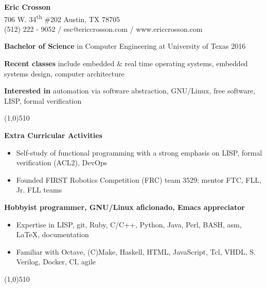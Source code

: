\documentclass{report}
\newcommand{\cut}{\begin{center} \line(1,0){510} \end{center}}
\begin{document}
\pagestyle{empty}
\setlength\parindent{0pt}

\begin{center}
  \textbf{Eric Crosson} \\
  706 W. 34\textsuperscript{th} \#202 Austin, TX 78705 \\
  (512) 222 - 9052 / esc@ericcrosson.com / www.ericcrosson.com
\end{center}

\textbf{Bachelor of Science} in Computer Engineering at University of Texas
2016

\vspace{1mm}

\textbf{Recent classes} include embedded \& real time operating systems,
embedded systems design, computer architecture

\vspace{1mm}

\textbf{Interested in} automation via software abstraction, GNU/Linux, free
software, LISP, formal verification

\cut{}

\textbf{Extra Curricular Activities}
\begin{itemize}[label=$\circ$]
\item Self-study of functional programming with a strong emphasis on LISP,
  formal verification (ACL2), DevOps
\item Founded FIRST Robotics Competition (FRC) team 3529; mentor FTC, FLL, Jr. FLL teams
\end{itemize}

\textbf{Hobbyist programmer, GNU/Linux aficionado, Emacs appreciator}
\begin{itemize}[label=$\circ$]
\item Expertise in LISP, git, Ruby, C/C++, Python, Java, Perl, BASH, asm,
  \LaTeX{}, documentation
\item Familiar with Octave, (C)Make, Haskell, HTML, JavaScript, Tcl, VHDL, S.
  Verilog, Docker, CI, agile
\end{itemize}

\cut{}
\end{document}
